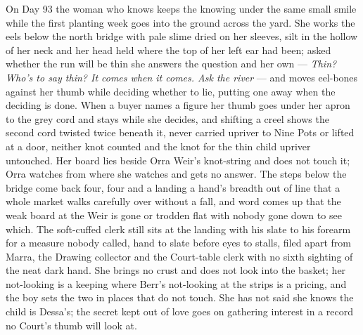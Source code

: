 \documentclass{design/chronicle}
\begin{document}
{On Day 93 the woman who knows keeps the knowing under the same small smile while the first planting week goes into the ground across the yard. She works the eels below the north bridge with pale slime dried on her sleeves, silt in the hollow of her neck and her head held where the top of her left ear had been; asked whether the run will be thin she answers the question and her own --- \emph{Thin? Who’s to say thin? It comes when it comes. Ask the river} --- and moves eel-bones against her thumb while deciding whether to lie, putting one away when the deciding is done. When a buyer names a figure her thumb goes under her apron to the grey cord and stays while she decides, and shifting a creel shows the second cord twisted twice beneath it, never carried upriver to Nine Pots or lifted at a door, neither knot counted and the knot for the thin child upriver untouched. Her board lies beside Orra Weir’s knot-string and does not touch it; Orra watches from where she watches and gets no answer. The steps below the bridge come back four, four and a landing a hand’s breadth out of line that a whole market walks carefully over without a fall, and word comes up that the weak board at the Weir is gone or trodden flat with nobody gone down to see which. The soft-cuffed clerk still sits at the landing with his slate to his forearm for a measure nobody called, hand to slate before eyes to stalls, filed apart from Marra, the Drawing collector and the Court-table clerk with no sixth sighting of the neat dark hand. She brings no crust and does not look into the basket; her not-looking is a keeping where Berr’s not-looking at the strips is a pricing, and the boy sets the two in places that do not touch. She has not said she knows the child is Dessa’s; the secret kept out of love goes on gathering interest in a record no Court’s thumb will look at.

}
\end{document}
